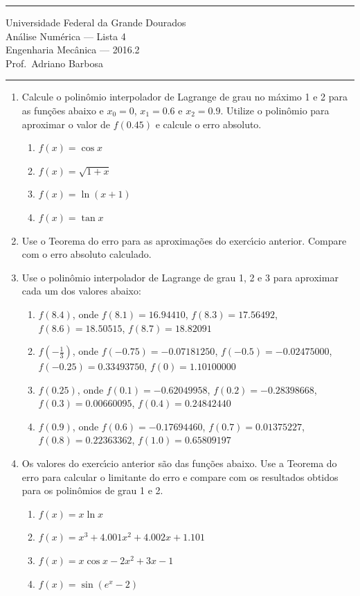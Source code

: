 \documentclass{article}
\newcommand{\ds}{\displaystyle}
\begin{document}
\noindent{}\rule{\textwidth}{0.4pt}
\begin{center}
	Universidade Federal da Grande Dourados\\
	An\'alise Num\'erica --- Lista 4 \\
	Engenharia Mec\^anica --- 2016.2 \\
	Prof.\ Adriano Barbosa
\end{center}
\noindent{}\rule{\textwidth}{0.4pt}

\begin{enumerate}
	\item Calcule o polin\^omio interpolador de Lagrange de grau no m\'aximo 1 e 2
		para as fun\c{c}\~oes abaixo e $x_0=0$, $x_1=0.6$ e $x_2=0.9$. Utilize o
		polin\^omio para aproximar o valor de $f(0.45)$ e calcule o erro
		absoluto.
		\begin{enumerate}
			\item $f(x) = \cos{x}$
			\item $f(x) = \sqrt{1+x}$
			\item $f(x) = \ln{(x+1)}$
			\item $f(x) = \tan{x}$
		\end{enumerate}
	
	\item Use o Teorema do erro para as aproxima\c{c}\~oes do exerc\'{\i}cio anterior.
		Compare com o erro absoluto calculado.

	\item Use o polin\^omio interpolador de Lagrange de grau 1, 2 e 3
		para aproximar cada um dos valores abaixo:
		\begin{enumerate}
			\item $f(8.4)$, onde $f(8.1) = 16.94410$, $f(8.3) = 17.56492$,
				$f(8.6) = 18.50515$, $f(8.7) = 18.82091$
			\item $f\left(\ds-\frac{1}{3}\right)$, onde $f(-0.75) =
				-0.07181250$, $f(-0.5)=-0.02475000$, $f(-0.25) = 0.33493750$,
				$f(0)=1.10100000$
			\item $f(0.25)$, onde $f(0.1) = -0.62049958$, $f(0.2) =
				-0.28398668$, $f(0.3) = 0.00660095$, $f(0.4) = 0.24842440$
			\item $f(0.9)$, onde $f(0.6) = -0.17694460$, $f(0.7) = 0.01375227$,
				$f(0.8) = 0.22363362$, $f(1.0) =0.65809197$
		\end{enumerate}

	\item Os valores do exerc\'{\i}cio anterior s\~ao das fun\c{c}\~oes abaixo. Use a Teorema do erro para calcular o limitante do erro e compare com os resultados obtidos para os polin\^omios de grau 1 e 2.
		\begin{enumerate}
			\item $f(x) = x \ln{x}$
			\item $f(x) = x^3 + 4.001x^2 + 4.002x + 1.101$
			\item $f(x) = x\cos{x} -2x^2 + 3x -1$
			\item $f(x) = \sin{(e^x-2)}$
		\end{enumerate}
		

\end{enumerate}
\end{document}
